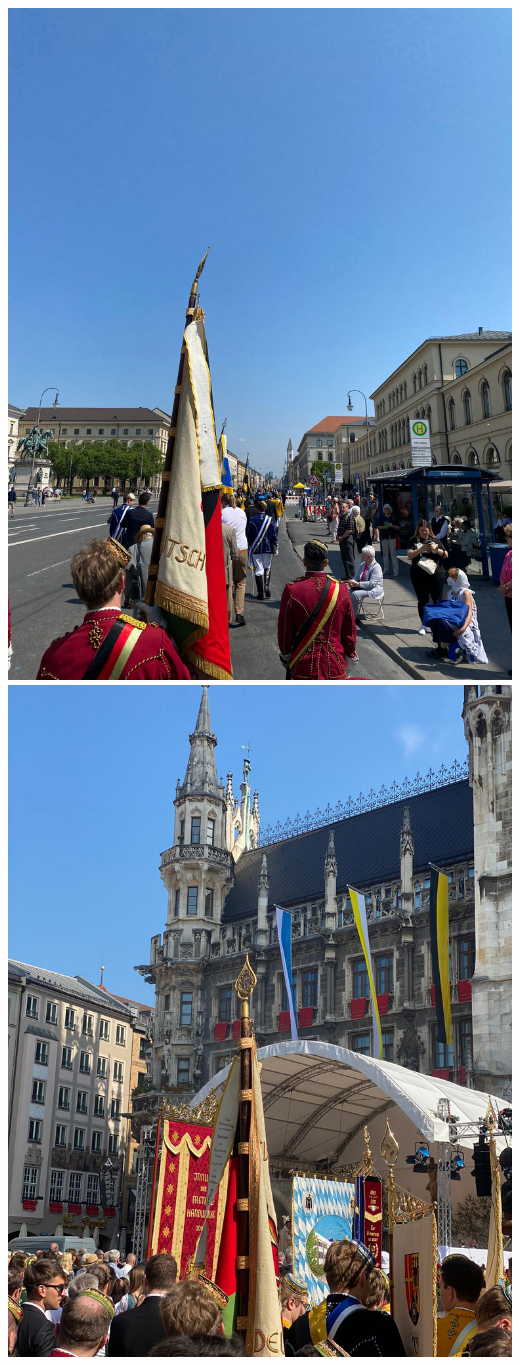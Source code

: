 \begin{figurehere}
		   \includegraphics[width=.45\linewidth]{Bilder/fronleichnam/fronleichnam (3).jpg}
		   \includegraphics[width=.45\linewidth]{Bilder/fronleichnam/fronleichnam (4).jpg}
		    
	\end{figurehere}

	
	
	

	

%
